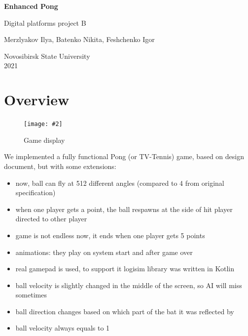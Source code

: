 \documentclass[12pt,a4paper]{article}
\let\oldsection\section
\renewcommand\section{\clearpage\oldsection}
\newcommand{\dofigure}[3][H]{
    \begin{figure}[#1]
        \centering
        \texttt{[image: \#2]}
        \caption{#3}
    \end{figure}
}
\begin{document}
    \begin{titlepage}
        \begin{center}
            \vspace*{0.3\textheight}

            {\Huge \textbf {Enhanced Pong}}

            {\LARGE Digital platforms project B}

            \vspace{1.5cm}
            Merzlyakov Ilya, Batenko Nikita, Feshchenko Igor

            \vfill
            Novosibirsk State University \\
            2021

        \end{center}
    \end{titlepage}
    \tableofcontents


    \section{Overview}
    \dofigure{main}{Game display}
    We implemented a fully functional Pong (or TV-Tennis) game, based on design document, but with some extensions:\begin{itemize}
        \item now, ball can fly at 512 different angles (compared to 4 from original specification)
        \item when one player gets a point, the ball respawns at the side of hit player directed to other player
        \item game is not endless now, it ends when one player gets 5 points
        \item animations: they play on system start and after game over 
        \item real gamepad is used, to support it logisim library was written in Kotlin 
        \item ball velocity is slightly changed in the middle of the screen, so AI will miss sometimes
        \item ball direction changes based on which part of the bat it was reflected by
        \item ball velocity always equals to 1
    \end{itemize}
\end{document}

